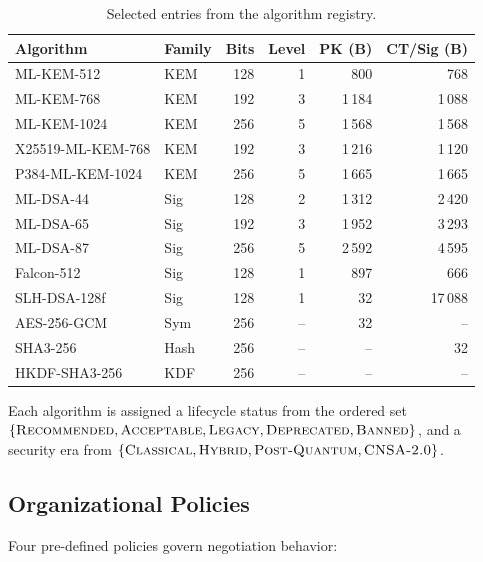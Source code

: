 \documentclass[conference,10pt]{IEEEtran}
\begin{document}
\begin{table}[t]
\centering
\caption{Selected entries from the algorithm registry.}
\label{tab:algorithm-registry}
\footnotesize
\begin{tabular}{@{}llrrrr@{}}
\toprule
\textbf{Algorithm} & \textbf{Family} & \textbf{Bits} & \textbf{Level} & \textbf{PK (B)} & \textbf{CT/Sig (B)} \\
\midrule
ML-KEM-512         & KEM  & 128 & 1 & 800   & 768   \\
ML-KEM-768         & KEM  & 192 & 3 & 1\,184 & 1\,088 \\
ML-KEM-1024        & KEM  & 256 & 5 & 1\,568 & 1\,568 \\
X25519-ML-KEM-768  & KEM  & 192 & 3 & 1\,216 & 1\,120 \\
P384-ML-KEM-1024   & KEM  & 256 & 5 & 1\,665 & 1\,665 \\
\midrule
ML-DSA-44          & Sig  & 128 & 2 & 1\,312 & 2\,420 \\
ML-DSA-65          & Sig  & 192 & 3 & 1\,952 & 3\,293 \\
ML-DSA-87          & Sig  & 256 & 5 & 2\,592 & 4\,595 \\
Falcon-512         & Sig  & 128 & 1 & 897   & 666   \\
SLH-DSA-128f       & Sig  & 128 & 1 & 32    & 17\,088 \\
\midrule
AES-256-GCM        & Sym  & 256 & -- & 32    & --    \\
SHA3-256            & Hash & 256 & -- & --    & 32    \\
HKDF-SHA3-256      & KDF  & 256 & -- & --    & --    \\
\bottomrule
\end{tabular}
\end{table}

Each algorithm is assigned a lifecycle status from the ordered set
$\{\textsc{Recommended}, \textsc{Acceptable}, \textsc{Legacy},
\textsc{Deprecated}, \textsc{Banned}\}$, and a security era from
$\{\textsc{Classical}, \textsc{Hybrid}, \textsc{Post-Quantum},
\textsc{CNSA-2.0}\}$.

\subsection{Organizational Policies}

Four pre-defined policies govern negotiation behavior:
\end{document}
